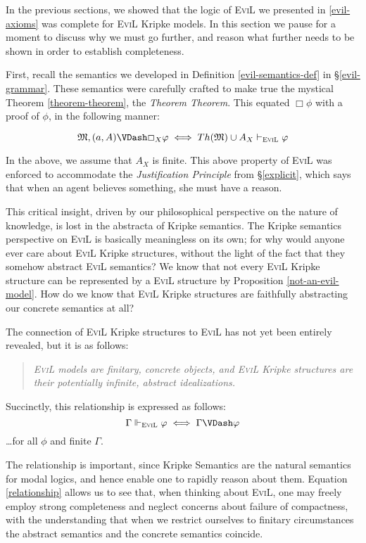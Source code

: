 In the previous sections, we showed that the logic of \textsc{EviL} we
presented in \ref{evil-axioms} was complete for \textsc{EviL} Kripke
models.  In this section we pause for a moment to discuss why we must
go further, and reason what further needs to be shown in order to
establish completeness.

First, recall the semantics we developed in
Definition \ref{evil-semantics-def} in \S\ref{evil-grammar}.
These semantics were carefully crafted to make true the mystical
Theorem \ref{theorem-theorem}, the \emph{Theorem Theorem}.  This
equated $\Box \phi$ with a proof of $\phi$, in the following manner:

\[ \mathfrak{M},(a,A) \VDash \Box_X \phi \iff Th(\mathfrak{M}) \cup A_X \vdash_{\textsc{EviL}} \phi \]

In the above, we assume that $A_X$ is finite. This above property of \textsc{EviL} was enforced to accommodate the \emph{Justification
  Principle} from \S\ref{explicit}, which says that when an agent
believes something, she must have a reason.

This critical insight, driven by our philosophical perspective on
the nature of knowledge, is lost in the abstracta of Kripke
semantics.  The Kripke semantics perspective on
\textsc{EviL} is basically meaningless on its own; 
for why would anyone ever care about \textsc{EviL} Kripke structures,
without the light of the fact that they somehow 
abstract \textsc{EviL} semantics?  
We know that not every \textsc{EviL} Kripke structure 
can be represented by a \textsc{EviL} structure by Proposition
\ref{not-an-evil-model}.  How do we know that \textsc{EviL} Kripke
structures are faithfully abstracting our concrete semantics at all?

The connection of \textsc{EviL} Kripke structures to \textsc{EviL} has
not yet been entirely revealed, but it is as follows: 
\begin{quote}
\emph{\textsc{EviL} models are finitary, concrete objects, and
  \textsc{EviL} Kripke structures are their potentially infinite, abstract idealizations.}
\end{quote}
Succinctly, this relationship is expressed as follows:
\begin{equation} 
\Gamma \Vdash_{\textsc{EviL}} \phi \iff \Gamma \VDash \phi \label{relationship}
\end{equation}
\ldots for all $\phi$ and finite $\Gamma$.

The relationship is important, since Kripke Semantics are the natural
semantics for modal logics, and hence enable one to rapidly reason
about them.  Equation \eqref{relationship} allows us to see  
that, when thinking about \textsc{EviL}, one 
may freely employ strong completeness and neglect
concerns about failure of compactness, with the understanding that
when we restrict ourselves to  finitary circumstances the abstract
semantics and the concrete semantics coincide.

